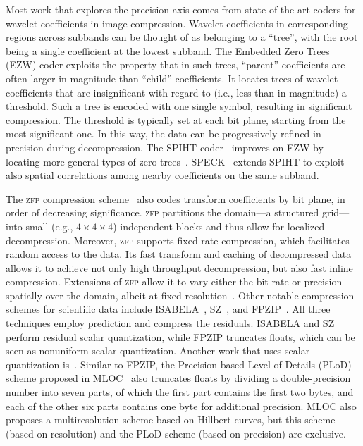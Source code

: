 Most work that explores the precision axis comes from state-of-the-art coders for wavelet
coefficients in image compression. Wavelet coefficients in corresponding regions across subbands can
be thought of as belonging to a ``tree'', with the root being a single coefficient at the lowest
subband. The Embedded Zero Trees (EZW) coder exploits the property that in such trees, ``parent''
coefficients are often larger in magnitude than ``child'' coefficients. It locates trees of wavelet
coefficients that are insignificant with regard to (i.e., less than in magnitude) a threshold. Such
a tree is encoded with one single symbol, resulting in significant compression. The threshold is
typically set at each bit plane, starting from the most significant one. In this way, the data can
be progressively refined in precision during decompression. The SPIHT coder~\cite{spiht1996}
improves on EZW by locating more general types of zero trees~\cite{quantifying-coding-performance}.
SPECK~\cite{speck2004} extends SPIHT to exploit also spatial correlations among nearby coefficients
on the same subband.

\newcommand{\zfp}{\textsc{zfp}\xspace}
The \zfp compression scheme~\cite{zfp2014} also codes transform coefficients by bit plane, in order
of decreasing significance. \zfp partitions the domain---a structured grid---into small (e.g., $4
\times 4 \times 4$) independent blocks and thus allow for localized decompression. Moreover, \zfp
supports fixed-rate compression, which facilitates random access to the data. Its fast transform and
caching of decompressed data allows it to achieve not only high throughput decompression, but also
fast inline compression. Extensions of \zfp allow it to vary either the bit rate or precision
spatially over the domain, albeit at fixed resolution~\cite{zfp-arc}. Other notable compression
schemes for scientific data include ISABELA~\cite{isabela}, SZ~\cite{sz}, and FPZIP~\cite{fpzip}.
All three techniques employ prediction and compress the residuals. ISABELA and SZ perform residual
scalar quantization, while FPZIP truncates floats, which can be seen as nonuniform scalar
quantization. Another work that uses scalar quantization is~\cite{sqe}. Similar to FPZIP, the
Precision-based Level of Details (PLoD) scheme proposed in MLOC~\cite{mloc} also truncates floats by
dividing a double-precision number into seven parts, of which the first part contains the first two
bytes, and each of the other six parts contains one byte for additional precision. MLOC also
proposes a multiresolution scheme based on Hillbert curves, but this scheme (based on resolution)
and the PLoD scheme (based on precision) are exclusive.

